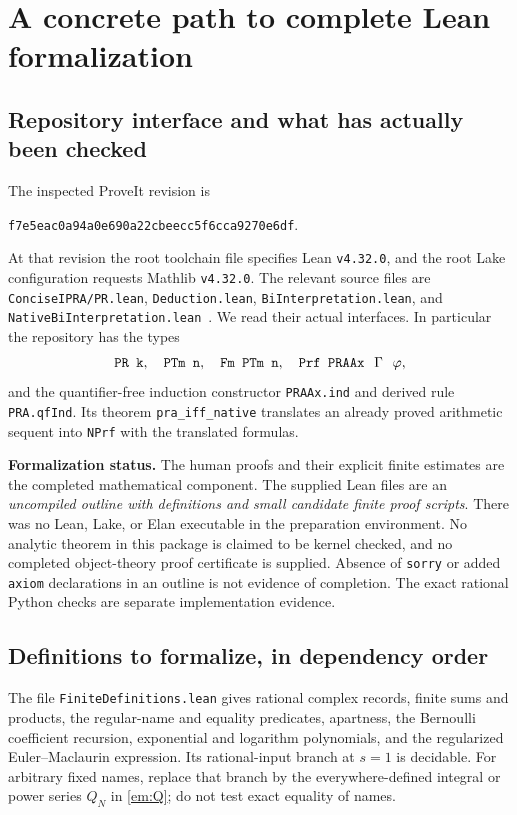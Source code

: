 \section{A concrete path to complete Lean formalization}
\label{sec:lean}

\subsection{Repository interface and what has actually been checked}
The inspected ProveIt revision is
\begin{center}
\texttt{f7e5eac0a94a0e690a22cbeecc5f6cca9270e6df}.
\end{center}
At that revision the root toolchain file specifies Lean \texttt{v4.32.0},
and the root Lake configuration requests Mathlib \texttt{v4.32.0}.
The relevant source files are \texttt{ConciseIPRA/PR.lean},
\texttt{Deduction.lean}, \texttt{BiInterpretation.lean}, and
\texttt{NativeBiInterpretation.lean}~\cite{ProveIt}. We read their actual
interfaces. In particular the repository has the types
\[
 \texttt{PR k},\quad\texttt{PTm n},\quad
 \texttt{Fm PTm n},\quad\texttt{Prf PRAAx \,$\Gamma$\, $\varphi$},
\]
and the quantifier-free induction constructor
\texttt{PRAAx.ind} and derived rule \texttt{PRA.qfInd}.
Its theorem \texttt{pra\_iff\_native} translates an already proved
arithmetic sequent into \texttt{NPrf} with the translated formulas.

\textbf{Formalization status.} The human proofs and their explicit
finite estimates are the completed mathematical component. The supplied
Lean files are an \emph{uncompiled outline with definitions and small
candidate finite proof scripts}. There was no Lean, Lake, or Elan
executable in the preparation environment. No analytic theorem in this
package is claimed to be kernel checked, and no completed object-theory
proof certificate is supplied. Absence of \texttt{sorry} or added
\texttt{axiom} declarations in an outline is not evidence of completion.
The exact rational Python checks are separate implementation evidence.

\subsection{Definitions to formalize, in dependency order}
The file \texttt{FiniteDefinitions.lean} gives rational complex records,
finite sums and products, the regular-name and equality predicates,
apartness, the Bernoulli coefficient recursion, exponential and logarithm
polynomials, and the regularized Euler--Maclaurin expression. Its
rational-input branch at $s=1$ is decidable. For arbitrary fixed names,
replace that branch by the everywhere-defined integral or power series
$Q_N$ in \eqref{em:Q}; do not test exact equality of names.

